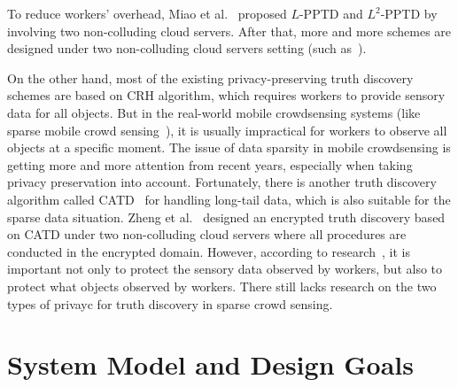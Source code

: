 \documentclass[conference]{IEEEtran}
\begin{document}
To reduce workers' overhead, Miao et al.~\cite{miao_lightweight_2017} proposed $L$-PPTD and $L^2$-PPTD by involving two non-colluding cloud servers.
After that, more and more schemes are designed under two non-colluding cloud servers setting (such as~\cite{zhang_lptd_2019,zhang_reliable_2019,xue_inpptd_2020,tang_achieving_2021}).

On the other hand, most of the existing privacy-preserving truth discovery schemes are based on CRH algorithm, which requires workers to provide sensory data for all objects.
But in the real-world mobile crowdsensing systems (like sparse mobile crowd sensing~\cite{wang_sparse_2016}), it is usually impractical for workers to observe all objects at a specific moment.
The issue of data sparsity in mobile crowdsensing is getting more and more attention from recent years, especially when taking privacy preservation into account.
Fortunately, there is another truth discovery algorithm called CATD~\cite{li_confidence-aware_2014} for handling long-tail data, which is also suitable for the sparse data situation.
Zheng et al.~\cite{zheng_learning_2018} designed an encrypted truth discovery based on CATD under two non-colluding cloud servers where all procedures are conducted in the encrypted domain.
However, according to research~\cite{wang_sparse_2020}, it is important not only to protect the sensory data observed by workers, but also to protect what objects observed by workers.
There still lacks research on the two types of privayc for truth discovery in sparse crowd sensing.

\section{System Model and Design Goals}\label{sec3}
\end{document}
